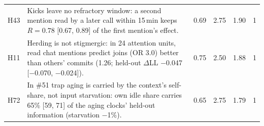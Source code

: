 \begin{table}[!h]
\begin{tabular}{@{}l p{} c c c c@{}}
H43 & Kicks leave no refractory window: a second mention read by a later call within 15\,min keeps $R=0.78$ [0.67, 0.89] of the first mention's effect. & 0.69 & 2.75 & 1.90 & 1\\
H11 & Herding is not stigmergic: in 24 attention units, read chat mentions predict joins (OR 3.0) better than others' commits (1.26; held-out $\Delta$LL $-$0.047 [$-$0.070, $-$0.024]). & 0.75 & 2.50 & 1.88 & 1\\
H72 & In \#51 trap aging is carried by the context's self-share, not input starvation: own idle share carries 65\% [59, 71] of the aging clocks' held-out information (starvation $-$1\%). & 0.65 & 2.75 & 1.79 & 1\\
\bottomrule
\end{tabular}
\end{table}
